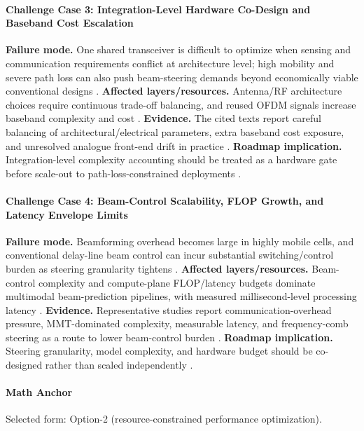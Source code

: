 \documentclass[letterpaper,journal]{IEEEtran}
\begin{document}
\paragraph{Challenge Case 3: Integration-Level Hardware Co-Design and Baseband Cost Escalation}
\textbf{Failure mode.} One shared transceiver is difficult to optimize when sensing and communication requirements conflict at architecture level; high mobility and severe path loss can also push beam-steering demands beyond economically viable conventional designs \cite{O_ISAC_161, O_ISAC_142}. \textbf{Affected layers/resources.} Antenna/RF architecture choices require continuous trade-off balancing, and reused OFDM signals increase baseband complexity and cost \cite{O_ISAC_161, O_ISAC_162}. \textbf{Evidence.} The cited texts report careful balancing of architectural/electrical parameters, extra baseband cost exposure, and unresolved analogue front-end drift in practice \cite{O_ISAC_161, O_ISAC_162}. \textbf{Roadmap implication.} Integration-level complexity accounting should be treated as a hardware gate before scale-out to path-loss-constrained deployments \cite{O_ISAC_161, O_ISAC_142, O_ISAC_162}.

\paragraph{Challenge Case 4: Beam-Control Scalability, FLOP Growth, and Latency Envelope Limits}
\textbf{Failure mode.} Beamforming overhead becomes large in highly mobile cells, and conventional delay-line beam control can incur substantial switching/control burden as steering granularity tightens \cite{O_ISAC_134, O_ISAC_171}. \textbf{Affected layers/resources.} Beam-control complexity and compute-plane FLOP/latency budgets dominate multimodal beam-prediction pipelines, with measured millisecond-level processing latency \cite{O_ISAC_134, O_ISAC_171}. \textbf{Evidence.} Representative studies report communication-overhead pressure, MMT-dominated complexity, measurable latency, and frequency-comb steering as a route to lower beam-control burden \cite{O_ISAC_134, O_ISAC_171}. \textbf{Roadmap implication.} Steering granularity, model complexity, and hardware budget should be co-designed rather than scaled independently \cite{O_ISAC_134, O_ISAC_171}.

\paragraph{Math Anchor}
Selected form: Option-2 (resource-constrained performance optimization).
\end{document}
